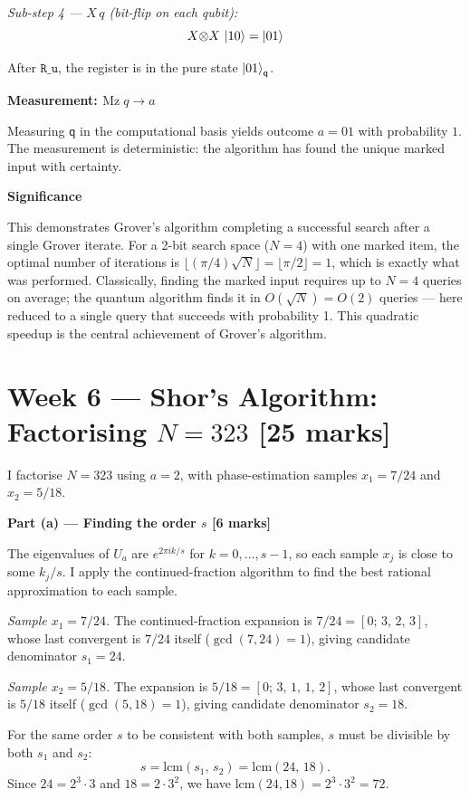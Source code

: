 \documentclass[12pt,a4paper]{article}
\begin{document}
\textit{Sub-step 4 --- $X\,q$ (bit-flip on each qubit):}
\[
  X{\otimes}X\,\ket{10} = \ket{01}
\]

After $\mathtt{R\_u}$, the register is in the pure state $\ket{01}_{\mathsf{q}}$.

\medskip
\textbf{Measurement: $\mathrm{Mz}\;q\to a$}

\medskip
Measuring $\mathsf{q}$ in the computational basis yields outcome $a=01$ with probability $1$.
The measurement is deterministic: the algorithm has found the unique marked input with certainty.

\medskip
\textbf{Significance}

\medskip
This demonstrates Grover's algorithm completing a successful search after a single Grover iterate.
For a 2-bit search space ($N=4$) with one marked item, the optimal number of iterations is
$\lfloor(\pi/4)\sqrt{N}\rfloor = \lfloor\pi/2\rfloor = 1$, which is exactly what was performed.
Classically, finding the marked input requires up to $N=4$ queries on average; the quantum algorithm
finds it in $O(\sqrt{N})=O(2)$ queries — here reduced to a single query that succeeds with probability 1.
This quadratic speedup is the central achievement of Grover's algorithm.

\section*{Week 6 --- Shor's Algorithm: Factorising $N=323$ [25 marks]}

I factorise $N=323$ using $a=2$, with phase-estimation samples
$x_1=7/24$ and $x_2=5/18$.

\medskip
\textbf{Part (a) --- Finding the order $s$ [6 marks]}

\medskip
The eigenvalues of $U_a$ are $e^{2\pi i k/s}$ for $k=0,\ldots,s-1$,
so each sample $x_j$ is close to some $k_j/s$.
I apply the continued-fraction algorithm to find the best rational approximation to each sample.

\textit{Sample $x_1=7/24$.} The continued-fraction expansion is
$7/24 = [0;\,3,\,2,\,3]$, whose last convergent is $7/24$ itself ($\gcd(7,24)=1$),
giving candidate denominator $s_1=24$.

\textit{Sample $x_2=5/18$.} The expansion is
$5/18=[0;\,3,\,1,\,1,\,2]$, whose last convergent is $5/18$ itself ($\gcd(5,18)=1$),
giving candidate denominator $s_2=18$.

For the same order $s$ to be consistent with both samples, $s$ must be divisible by both $s_1$ and $s_2$:
\[
  s = \mathrm{lcm}(s_1,\,s_2) = \mathrm{lcm}(24,\,18).
\]
Since $24=2^3\cdot3$ and $18=2\cdot3^2$, we have $\mathrm{lcm}(24,18)=2^3\cdot3^2=72$.
\end{document}
